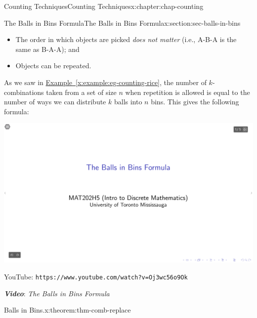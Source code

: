 \documentclass[oneside,10pt,]{book}
\newcommand{\xreffont}{\relax}
\newcommand{\mono}[1]{\texttt{#1}}
\newcommand{\alert}[1]{\textbf{\textit{#1}}}
\numberwithin{equation}{section}
\newlength{\qrsize}
\newlength{\previewwidth}
\begin{document}
\begin{chapterptx}{Counting Techniques}{}{Counting Techniques}{}{}{x:chapter:chap-counting}
\begin{sectionptx}{The Balls in Bins Formula}{}{The Balls in Bins Formula}{}{}{x:section:sec-balls-in-bins}
\begin{itemize}[label=\textbullet]
\item{}The order in which objects are picked \emph{does not matter} (i.e.\@, A-B-A is the same as B-A-A); and%
\item{}Objects can be repeated.%
\end{itemize}
As we saw in \hyperref[x:example:eg-counting-rice]{Example~{\xreffont\ref{x:example:eg-counting-rice}}}, the number of \(k\)-combinations taken from a set of size \(n\) when repetition is allowed is equal to the number of ways we can distribute \(k\) balls into \(n\) bins. This gives the following formula:%
\begin{sidebyside}{1}{0}{0}{0}%
\begin{sbspanel}{1}%
\setlength{\qrsize}{9em}
\setlength{\previewwidth}{\linewidth}
\addtolength{\previewwidth}{-\qrsize}
\begin{tcbraster}[raster columns=2, raster column skip=1pt, raster halign=center, raster force size=false, raster left skip=0pt, raster right skip=0pt]%
\begin{tcolorbox}[previewstyle, width=\previewwidth]%
\includegraphics[width=0.80\linewidth,height=\qrsize,keepaspectratio]{images/08-thumb.png}%
\end{tcolorbox}%
\begin{tcolorbox}[qrstyle]%
{\hypersetup{urlcolor=black}}%
\end{tcolorbox}%
\begin{tcolorbox}[captionstyle]%
\small YouTube: \mono{https://www.youtube.com/watch?v=Oj3wc56o9Ok}\end{tcolorbox}%
\end{tcbraster}%
\end{sbspanel}%
\end{sidebyside}%
\par
\alert{Video}: \emph{The Balls in Bins Formula}%
\begin{theorem}{Balls in Bins.}{}{x:theorem:thm-comb-replace}%

\end{theorem}
\end{sectionptx}
\end{chapterptx}
\end{document}
